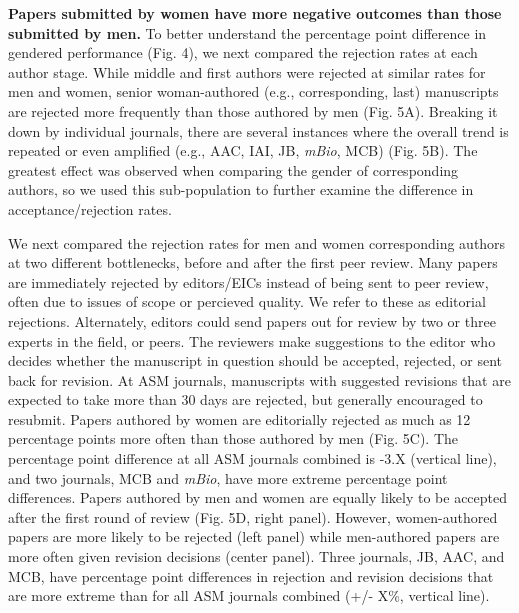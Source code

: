 \documentclass[11pt,]{article}
\begin{document}
\textbf{Papers submitted by women have more negative outcomes than those
submitted by men.} To better understand the percentage point difference
in gendered performance (Fig. 4), we next compared the rejection rates
at each author stage. While middle and first authors were rejected at
similar rates for men and women, senior woman-authored (e.g.,
corresponding, last) manuscripts are rejected more frequently than those
authored by men (Fig. 5A). Breaking it down by individual journals,
there are several instances where the overall trend is repeated or even
amplified (e.g., AAC, IAI, JB, \emph{mBio}, MCB) (Fig. 5B). The greatest
effect was observed when comparing the gender of corresponding authors,
so we used this sub-population to further examine the difference in
acceptance/rejection rates.

We next compared the rejection rates for men and women corresponding
authors at two different bottlenecks, before and after the first peer
review. Many papers are immediately rejected by editors/EICs instead of
being sent to peer review, often due to issues of scope or percieved
quality. We refer to these as editorial rejections. Alternately, editors
could send papers out for review by two or three experts in the field,
or peers. The reviewers make suggestions to the editor who decides
whether the manuscript in question should be accepted, rejected, or sent
back for revision. At ASM journals, manuscripts with suggested revisions
that are expected to take more than 30 days are rejected, but generally
encouraged to resubmit. Papers authored by women are editorially
rejected as much as 12 percentage points more often than those authored
by men (Fig. 5C). The percentage point difference at all ASM journals
combined is -3.X (vertical line), and two journals, MCB and \emph{mBio},
have more extreme percentage point differences. Papers authored by men
and women are equally likely to be accepted after the first round of
review (Fig. 5D, right panel). However, women-authored papers are more
likely to be rejected (left panel) while men-authored papers are more
often given revision decisions (center panel). Three journals, JB, AAC,
and MCB, have percentage point differences in rejection and revision
decisions that are more extreme than for all ASM journals combined (+/-
X\%, vertical line).
\end{document}
